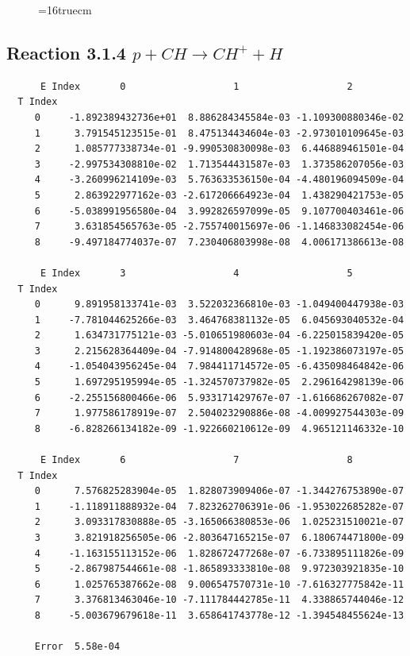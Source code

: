 \documentclass[12pt,dvipdfmx]{article}
\begin{document}
\begin{figure} \label{met.3_3.1.3}
\epsfxsize=16truecm
\end{figure}
\newpage


\subsection{
Reaction 3.1.4    $p + CH \rightarrow CH^+ + H $
}


\begin{small}\begin{verbatim}
      E Index       0                   1                   2
  T Index
     0     -1.892389432736e+01  8.886284345584e-03 -1.109300880346e-02
     1      3.791545123515e-01  8.475134434604e-03 -2.973010109645e-03
     2      1.085777338734e-01 -9.990530830098e-03  6.446889461501e-04
     3     -2.997534308810e-02  1.713544431587e-03  1.373586207056e-03
     4     -3.260996214109e-03  5.763633536150e-04 -4.480196094509e-04
     5      2.863922977162e-03 -2.617206664923e-04  1.438290421753e-05
     6     -5.038991956580e-04  3.992826597099e-05  9.107700403461e-06
     7      3.631854565763e-05 -2.755740015697e-06 -1.146833082454e-06
     8     -9.497184774037e-07  7.230406803998e-08  4.006171386613e-08

      E Index       3                   4                   5
  T Index
     0      9.891958133741e-03  3.522032366810e-03 -1.049400447938e-03
     1     -7.781044625266e-03  3.464768381132e-05  6.045693040532e-04
     2      1.634731775121e-03 -5.010651980603e-04 -6.225015839420e-05
     3      2.215628364409e-04 -7.914800428968e-05 -1.192386073197e-05
     4     -1.054043956245e-04  7.984411714572e-05 -6.435098464842e-06
     5      1.697295195994e-05 -1.324570737982e-05  2.296164298139e-06
     6     -2.255156800466e-06  5.933171429767e-07 -1.616686267082e-07
     7      1.977586178919e-07  2.504023290886e-08 -4.009927544303e-09
     8     -6.828266134182e-09 -1.922660210612e-09  4.965121146332e-10

      E Index       6                   7                   8
  T Index
     0      7.576825283904e-05  1.828073909406e-07 -1.344276753890e-07
     1     -1.118911888932e-04  7.823262706391e-06 -1.953022685282e-07
     2      3.093317830888e-05 -3.165066380853e-06  1.025231510021e-07
     3      3.821918256505e-06 -2.803647165215e-07  6.180674471800e-09
     4     -1.163155113152e-06  1.828672477268e-07 -6.733895111826e-09
     5     -2.867987544661e-08 -1.865893333810e-08  9.972303921835e-10
     6      1.025765387662e-08  9.006547570731e-10 -7.616327775842e-11
     7      3.376813463046e-10 -7.111784442785e-11  4.338865744046e-12
     8     -5.003679679618e-11  3.658641743778e-12 -1.394548455624e-13

     Error  5.58e-04
\end{verbatim}\end{small}
\end{document}
